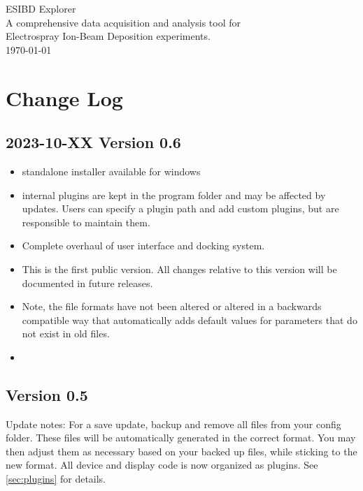 \documentclass[a4paper,11pt,DIV=13]{scrartcl}
\newif\ifverboose
\begin{document}
\begin{centering}
{\LARGE ESIBD Explorer}\\
\vspace{.5cm}
{\Large A comprehensive data acquisition and analysis tool for \\ Electrospray Ion-Beam Deposition experiments.} \\
\vspace{.5cm}
{\today}\\
\end{centering}

\tableofcontents

\section{Change Log}

\subsection{2023-10-XX Version 0.6}
\begin{itemize}
\item standalone installer available for windows
\item internal plugins are kept in the program folder and may be affected by updates. Users can specify a plugin path and add custom plugins, but are responsible to maintain them.
\item Complete overhaul of user interface and docking system.
\item This is the first public version. All changes relative to this version will be documented in future releases.
\item Note, the file formats have not been altered or altered in a backwards compatible way that automatically adds default values for parameters that do not exist in old files.
\item
\end{itemize}

\subsection{Version 0.5}
Update notes: For a save update, backup and remove all files from your config folder. These files will be automatically generated in the correct format. You may then adjust them as necessary based on your backed up files, while sticking to the new format.
All device and display code is now organized as plugins. See \ref{sec:plugins} for details.
\end{document}
